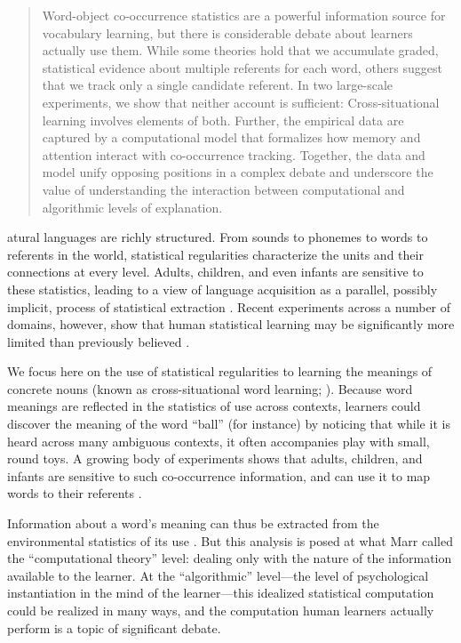 \documentclass{pnastwo}
\begin{document}
\begin{article}
\begin{abstract}
Word-object co-occurrence statistics are a powerful information source for vocabulary learning, but there is considerable debate about learners actually use them. While some theories hold that we accumulate graded, statistical evidence about multiple referents for each word, others suggest that we track only a single candidate referent. In two large-scale experiments, we show that neither account is sufficient: Cross-situational learning involves elements of both. Further, the empirical data are captured by a computational model that formalizes how memory and attention interact with co-occurrence tracking. Together, the data and model unify opposing positions in a complex debate and underscore the value of understanding the interaction between computational and algorithmic levels of explanation.
\end{abstract}

atural languages are richly structured. From sounds to phonemes to words to referents in the world, statistical regularities characterize the units and their connections at every level. Adults, children, and even infants are sensitive to these statistics, leading to a view of language acquisition as a parallel, possibly implicit, process of statistical extraction \citep{Saffran1996a, Gomez2000}. Recent experiments across a number of domains, however, show that human statistical learning may be significantly more limited than previously believed \citep{Johnson2010c, Yurovsky2012c, Trueswell2013}.

We focus here on the use of statistical regularities to learning the meanings of concrete nouns (known as cross-situational word learning; \citealp{Pinker1989, Siskind1996, Yu2007}). Because word meanings are reflected in the statistics of use across contexts, learners could discover the meaning of the word ``ball'' (for instance) by noticing that while it is heard across many ambiguous contexts, it often accompanies play with small, round toys. A growing body of experiments shows that adults, children, and infants are sensitive to such co-occurrence information, and can use it to map words to their referents \citep{Yu2007, Smith2008, Scott2012, Vlach2013}.

Information about a word's meaning can thus be extracted from the environmental statistics of its use \cite{Frank2009a}. But this analysis is posed at what Marr \citep{Marr1982} called the ``computational theory'' level: dealing only with the nature of the information available to the learner. At the ``algorithmic'' level---the level of psychological instantiation in the mind of the learner---this idealized statistical computation could be realized in many ways, and the computation human learners actually perform is a topic of significant debate. 


\end{article}
\end{document}
